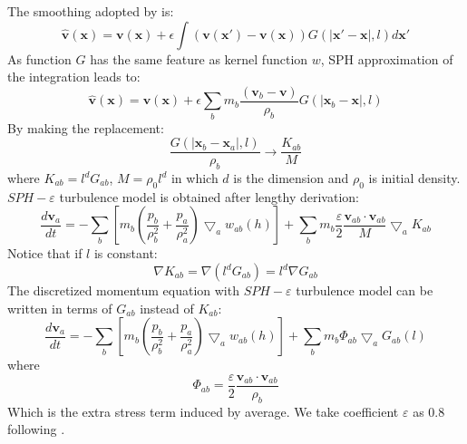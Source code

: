The smoothing adopted by \citet{monaghan2011turbulence}  is:
\begin{equation}
\widehat{\textbf{v}}\left(\textbf{x}\right)=\textbf{v}\left(\textbf{x}\right)+ \epsilon \int \left(\textbf{v}\left(\textbf{x} \prime\right)-\textbf{v}\left(\textbf{x}\right)\right)G\left(\vert \textbf{x} \prime - \textbf{x} \vert, l\right) d\textbf{x} \prime
\end{equation}
As function $G$ has the same feature as kernel function $w$, SPH approximation of the integration leads to:
\begin{equation} \label{eq:SPH-epsilon-filtering}
\widehat{\textbf{v}}\left(\textbf{x}\right)=\textbf{v}\left(\textbf{x}\right)+\epsilon \sum_b m_b \dfrac{\left(\textbf{v}_b -\textbf{v}\right)}{\rho _b} G\left(\vert \textbf{x} _b - \textbf{x} \vert, l\right)
\end{equation}
By making the replacement:
\begin{equation}
\label{eq:replacement-in-turb-derive}
\dfrac{G\left(\vert \textbf{x} _b - \textbf{x} _a \vert, l\right)}{\rho _b} \rightarrow \dfrac{K_{ab}}{M}
\end{equation}
where $K_{ab} = l^d G_{ab}$, $M = \rho_0 l^d$ in which $d$ is the dimension and $\rho_0$ is initial density. $SPH-\varepsilon$ turbulence model is obtained after lengthy derivation:
\begin{equation}
\label{eq:monaghan-mom-turb}
\dfrac{d \textbf{v}_a}{dt} = -\sum_b \left[ m_b \left(\dfrac{p_b}{\rho_b^2} + \dfrac{p_a}{\rho_a^2}\right) \bigtriangledown_aw_{a b}\left(h\right)\right] + \sum_b m_b \dfrac{\varepsilon}{2} \dfrac{\textbf{v}_{ab} \cdot \textbf{v}_{ab}}{M} \bigtriangledown_a K_{ab}
\end{equation}
Notice that if $l$ is constant: 
%
%
\begin{equation}
\nabla K_{ab} = \nabla \left(l^d G_{ab}\right) = l^d \nabla G_{ab}
\end{equation}
The discretized momentum equation with $SPH-\varepsilon$ turbulence model can be written in terms of $G_{ab}$ instead of $K_{ab}$:
\begin{equation}
\label{eq:SPH-mom-epsilon-turb}
\dfrac{d \textbf{v}_a}{dt} = -\sum_b \left[m_b \left(\dfrac{p_b}{\rho_b^2} + \dfrac{p_a}{\rho_a^2}\right) \bigtriangledown_aw_{a b}\left(h\right)\right] + \sum_b m_b \Phi_{ab}\bigtriangledown_aG_{ab}\left(l\right)
\end{equation}
where 
\begin{equation}
\Phi_{ab}=\dfrac{\varepsilon}{2} \dfrac{\textbf{v}_{ab} \cdot \textbf{v}_{ab}}{\rho_b} 
\end{equation}
Which is the extra stress term induced by average. We take coefficient $\varepsilon$ as 0.8 following \citet{monaghan2011turbulence}.

